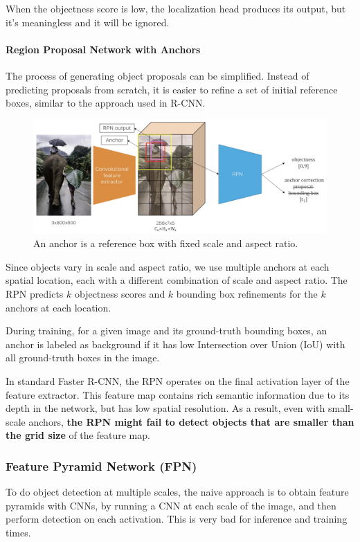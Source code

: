 When the objectness score is low, the localization head produces its output, but it's meaningless and it will be ignored.

\paragraph{Region Proposal Network with Anchors}
The process of generating object proposals can be simplified. Instead of predicting proposals from scratch, it is easier to refine a set of initial reference boxes, similar to the approach used in R-CNN.

\begin{figure}[htbp]
  \centering
  \includegraphics[width=0.6\linewidth]{./img/rpn_anchor.jpg}
  \caption{An anchor is a reference box with fixed scale and aspect ratio.}
\end{figure}

Since objects vary in scale and aspect ratio, we use multiple anchors at each spatial location, each with a different combination of scale and aspect ratio. The RPN predicts $k$ objectness scores and $k$ bounding box refinements for the $k$ anchors at each location.

During training, for a given image and its ground-truth bounding boxes, an anchor is labeled as background if it has low Intersection over Union (IoU) with all ground-truth boxes in the image.

In standard Faster R-CNN, the RPN operates on the final activation layer of the feature extractor. This feature map contains rich semantic information due to its depth in the network, but has low spatial resolution. As a result, even with small-scale anchors, \textbf{the RPN might fail to detect objects that are smaller than the grid size} of the feature map.

\subsubsection{Feature Pyramid Network (FPN)}
To do object detection at multiple scales, the naive approach is to obtain feature pyramids with CNNs, by running a CNN at each scale of the image, and then perform detection on each activation.
This is very bad for inference and training times.

